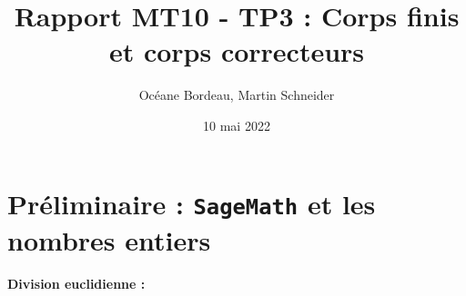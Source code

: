 \documentclass[titlepage]{article}
\title{Rapport MT10 - TP3 : Corps finis et corps correcteurs}
\author{Océane Bordeau, Martin Schneider}
\date{10 mai 2022}
\begin{document}
    \maketitle
    \tableofcontents
    \pagebreak

    \section{Préliminaire : \texttt{SageMath} et les nombres entiers}
    \textbf{Division euclidienne :}
\end{document}
